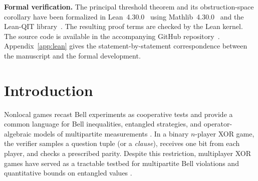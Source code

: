 \documentclass[11pt]{article}
\theoremstyle{definition}
\theoremstyle{remark}
\numberwithin{equation}{section}
\begin{document}
\endgroup
\begin{abstract}

We determine the smallest number of active questions per player at which a
four-player binary exclusive-or (XOR) game of commuting-operator value one
need not admit a Greenberger--Horne--Zeilinger (GHZ) equatorial realization.
Such a realization uses the four-qubit GHZ state and equatorial qubit
observables, reducing perfect play to additive phase equations. We prove that
every four-player XOR game with commuting-operator value one and at most three
active questions per player has a perfect GHZ-equatorial strategy. Conversely,
we construct a uniform eight-clause game with four active questions per player
whose commuting-operator value is one but whose phase equations are
inconsistent. Thus four is the sharp local-question threshold. The positive
result follows by lifting every integral incidence obstruction to an ordered
noncommutative refutation, using primitive circuits, forest matchings, and
ternary Hamming geometry. For the separating game, a Klein four-group
incidence relation obstructs the phase system, while an even-subgroup normal
form and degree-one and degree-two Magnus coefficients exclude refutations of
arbitrary length.
\end{abstract}
\vspace{5mm}
\medskip
\noindent\textbf{Formal verification.}
The principal threshold theorem and its obstruction-space corollary have
been formalized in Lean~4.30.0~\cite{deMouraUllrich2021} using
Mathlib~4.30.0~\cite{mathlib2020} and the Lean-QIT
library~\cite{ZhuEtAl2026LeanQIT}. The resulting proof terms are checked by
the Lean kernel. The source code is available in the accompanying GitHub
repository~\cite{FourPlayerXORGames2026}.
Appendix~\ref{app:lean} gives the statement-by-statement correspondence
between the manuscript and the formal development.
\medskip
\newpage
\setcounter{tocdepth}{2}
\tableofcontents

\section{Introduction}\label{sec:introduction}

Nonlocal games recast Bell experiments as cooperative tests and provide a
common language for Bell inequalities, entangled strategies, and
operator-algebraic models of multipartite measurements
\cite{Bell1964,ClauserHorneShimonyHolt1969,
CleveHoyerTonerWatrous2004}.  In a binary \(n\)-player XOR game, the verifier
samples a question tuple (or a \emph{clause}), receives one bit from each player, and checks a
prescribed parity.  
Despite this
restriction, multiplayer XOR games have served as a tractable testbed for
multipartite Bell violations and quantitative bounds on entangled values
\cite{PerezGarciaEtAl2008,BrietVidick2013}. 
\end{document}
